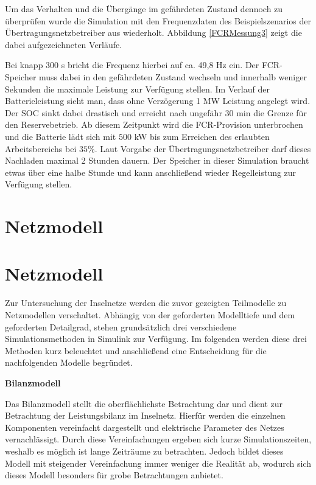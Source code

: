 Um das Verhalten und die Übergänge im gefährdeten Zustand dennoch zu überprüfen wurde die Simulation mit den Frequenzdaten
des Beispielszenarios der Übertragungsnetzbetreiber aus \parencite[]{Reservebetrieb} wiederholt.
Abbildung \ref{FCRMessung3} zeigt die dabei aufgezeichneten Verläufe.

Bei knapp 300 s bricht die Frequenz hierbei auf ca. 49,8 Hz ein.
Der FCR-Speicher muss dabei in den gefährdeten Zustand wechseln und innerhalb weniger Sekunden
die maximale Leistung zur Verfügung stellen.
Im Verlauf der Batterieleistung sieht man, dass ohne Verzögerung 1 MW Leistung angelegt wird.
Der SOC sinkt dabei drastisch und erreicht nach ungefähr 30 min die Grenze für den Reservebetrieb.
Ab diesem Zeitpunkt wird die FCR-Provision unterbrochen und die Batterie lädt sich mit $500$ kW 
bis zum Erreichen des erlaubten Arbeitsbereichs bei $35 \%$.
Laut Vorgabe der Übertragungsnetzbetreiber darf dieses Nachladen maximal 2 Stunden dauern.
Der Speicher in dieser Simulation braucht etwas über eine halbe Stunde und kann anschließend wieder
Regelleistung zur Verfügung stellen.



\section{Netzmodell}
\section{Netzmodell}

Zur Untersuchung der Inselnetze werden die zuvor gezeigten Teilmodelle zu Netzmodellen verschaltet. Abhängig von der geforderten Modelltiefe und dem geforderten Detailgrad, stehen grundsätzlich drei verschiedene Simulationsmethoden in Simulink zur Verfügung. Im folgenden werden diese drei Methoden kurz beleuchtet und anschließend eine Entscheidung für die nachfolgenden Modelle begründet.

\textbf{Bilanzmodell}

Das Bilanzmodell stellt die oberflächlichste Betrachtung dar und dient zur Betrachtung der Leistungsbilanz im Inselnetz. Hierfür werden die einzelnen Komponenten vereinfacht dargestellt und elektrische Parameter des Netzes vernachlässigt. Durch diese Vereinfachungen ergeben sich kurze Simulationszeiten, weshalb es möglich ist lange Zeiträume zu betrachten. Jedoch bildet dieses Modell mit steigender Vereinfachung immer weniger die Realität ab, wodurch sich dieses Modell besonders für grobe Betrachtungen anbietet.

